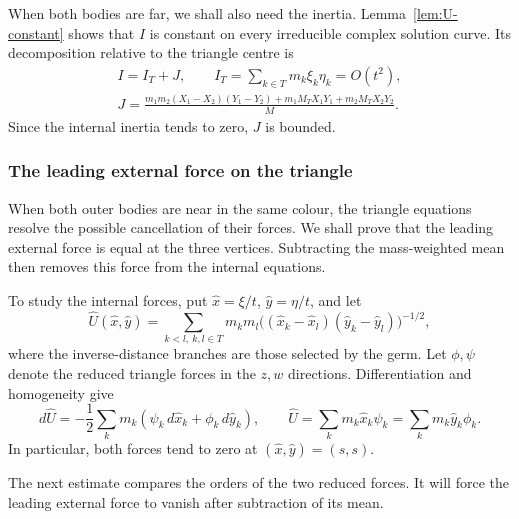 \documentclass[Threeside,11pt]{article}
\theoremstyle{definition}
\theoremstyle{remark}
\numberwithin{equation}{section}
\theoremstyle{remark}
\begin{document}
{When both bodies are far, we shall also need the inertia.
Lemma~\ref{lem:U-constant} shows that $I$ is constant on every irreducible
complex solution curve.  Its decomposition relative to the triangle centre is
\begin{equation}\label{d5-eq-inertia}
 \begin{gathered}
 I=I_T+J,\qquad I_T=\sum_{k\in T}m_k\xi_k\eta_k=O(t^2),\\
 J=\frac{m_1m_2(X_1-X_2)(Y_1-Y_2)+m_1M_TX_1Y_1+m_2M_TX_2Y_2}{M}.
 \end{gathered}
\end{equation}
Since the internal inertia tends to zero, $J$ is bounded.

\subsubsection{The leading external force on the triangle}\label{d5-mb}
When both outer bodies are near in the same colour, the triangle equations
resolve the possible cancellation of their forces. We shall prove that the
leading external force is equal at the three vertices. Subtracting the
mass-weighted mean then removes this force from the internal equations.

To study the internal forces, put $\hat x=\xi/t$, $\hat y=\eta/t$, and let
\[
 \widehat U(\hat x,\hat y)=\sum_{k<l,\ k,l\in T}m_km_l
 \bigl((\hat x_k-\hat x_l)(\hat y_k-\hat y_l)\bigr)^{-1/2},
\]
where the inverse-distance branches are those selected by the germ.
Let $\phi,\psi$ denote the reduced triangle forces in the $z,w$ directions.
Differentiation and homogeneity give
\begin{equation}\label{d5-eq-potential-identities}
 d\widehat U=-\frac12\sum_km_k(\psi_k\,d\hat x_k+\phi_k\,d\hat y_k),
 \qquad
 \widehat U=\sum_km_k\hat x_k\psi_k=\sum_km_k\hat y_k\phi_k.
\end{equation}
In particular, both forces tend to zero at $(\hat x,\hat y)=(s,s)$.

The next estimate compares the orders of the two reduced forces. It will force
the leading external force to vanish after subtraction of its mean.

}
\end{document}
